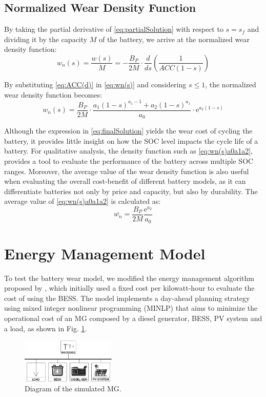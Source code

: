 \documentclass{ieeeaccess}
\begin{document}
    \subsection{Normalized Wear Density Function}
    By taking the partial derivative of \eqref{eq:partialSolution} with respect to $s=s_f$ and dividing it by the capacity $M$ of the battery, we arrive at the normalized wear density function:
    \begin{equation}
        w_n(s) = \frac{w(s)}{M} = - \frac{B_P}{2M} \cdot \frac{d}{ds} \left( \frac{1}{ACC(1-s)} \right)
        \label{eq:wn(s)}
    \end{equation}

    By substituting \eqref{eq:ACC(d)} in \eqref{eq:wn(s)} and considering $s \le 1$, the normalized wear density function becomes:
    \begin{equation}
        w_n(s) = \frac{B_P}{2M} \cdot \frac{a_1(1-s)^{a_1-1} + a_2(1-s)^{a_1}}{a_0} \cdot \mathrm{e}^{a_2(1-s)}
        \label{eq:wn(s)a0a1a2}
    \end{equation}

    Although the expression in \eqref{eq:finalSolution} yields the wear cost of cycling the battery, it provides little insight on how the SOC level impacts the cycle life of a battery. For qualitative analysis, the density function such as \eqref{eq:wn(s)a0a1a2}, provides a tool to evaluate the performance of the battery across multiple SOC ranges. Moreover, the average value of the wear density function is also useful when evaluating the overall cost-benefit of different battery models, as it can differentiate batteries not only by price and capacity, but also by durability. The average value of \eqref{eq:wn(s)a0a1a2} is calculated as:
    \begin{equation}
        \overline{w_n} = \frac{B_P}{2M} \frac{\mathrm{e}^{a_2}}{a_0}
    \end{equation}

    \section{Energy Management Model}
    To test the battery wear model, we modified the energy management algorithm proposed by \cite{SANTOS2018}, which initially used a fixed cost per kilowatt-hour to evaluate the cost of using the BESS. The model implements a day-ahead planning strategy using mixed integer nonlinear programming (MINLP) that aims to minimize the operational cost of an MG composed by a diesel generator, BESS, PV system and a load, as shown in Fig. \ref{fig:mg1}.
    \begin{figure}[htbp]
        \centering
        \includegraphics[width=0.4\textwidth]{figures/mg2.png}
        \caption{Diagram of the simulated MG.}
        \label{fig:mg1}
    \end{figure}
\end{document}
